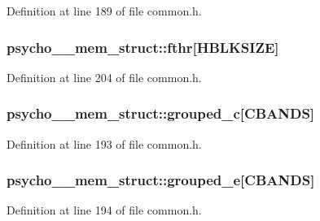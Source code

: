 Definition at line 189 of file common.\+h.

\subsubsection[{\texorpdfstring{fthr}{fthr}}]{ psycho\+\_\+\_\+mem\+\_\+struct\+::fthr\mbox{[}{\bf H\+B\+L\+K\+S\+I\+ZE}\mbox{]}}\hypertarget{structpsycho__4__mem__struct_aecd2e2196a944685602a1bb7853eaec4}{}\label{structpsycho__4__mem__struct_aecd2e2196a944685602a1bb7853eaec4}


Definition at line 204 of file common.\+h.

\subsubsection[{\texorpdfstring{grouped\+\_\+c}{grouped_c}}]{ psycho\+\_\+\_\+mem\+\_\+struct\+::grouped\+\_\+c\mbox{[}{\bf C\+B\+A\+N\+DS}\mbox{]}}\hypertarget{structpsycho__4__mem__struct_a269e1259ce6539d93528320edb6e9682}{}\label{structpsycho__4__mem__struct_a269e1259ce6539d93528320edb6e9682}


Definition at line 193 of file common.\+h.

\subsubsection[{\texorpdfstring{grouped\+\_\+e}{grouped_e}}]{ psycho\+\_\+\_\+mem\+\_\+struct\+::grouped\+\_\+e\mbox{[}{\bf C\+B\+A\+N\+DS}\mbox{]}}\hypertarget{structpsycho__4__mem__struct_aec998268cf8863f5a8fcd48f2bf6e668}{}\label{structpsycho__4__mem__struct_aec998268cf8863f5a8fcd48f2bf6e668}


Definition at line 194 of file common.\+h.

